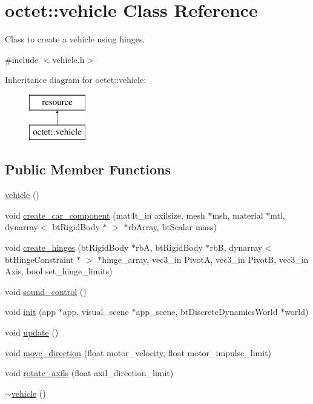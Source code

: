 \hypertarget{classoctet_1_1vehicle}{\section{octet\+:\+:vehicle Class Reference}
\label{classoctet_1_1vehicle}
}


Class to create a vehicle using hinges.  




{\ttfamily \#include $<$vehicle.\+h$>$}

Inheritance diagram for octet\+:\+:vehicle\+:\begin{figure}[H]
\begin{center}
\leavevmode
\includegraphics[height=2.000000cm]{classoctet_1_1vehicle}
\end{center}
\end{figure}
\subsection*{Public Member Functions}
\begin{DoxyCompactItemize}
\item 
\hyperlink{classoctet_1_1vehicle_a22017fec042aa7732f1699b535390787}{vehicle} ()
\item 
void \hyperlink{classoctet_1_1vehicle_aa0d5baefeba0587e62f9c62dc87506fb}{create\+\_\+car\+\_\+component} (mat4t\+\_\+in axilsize, mesh $\ast$msh, material $\ast$mtl, dynarray$<$ bt\+Rigid\+Body $\ast$ $>$ $\ast$rb\+Array, bt\+Scalar mass)
\item 
void \hyperlink{classoctet_1_1vehicle_a36bcb4433889025632bfec79f681a877}{create\+\_\+hinges} (bt\+Rigid\+Body $\ast$rb\+A, bt\+Rigid\+Body $\ast$rb\+B, dynarray$<$ bt\+Hinge\+Constraint $\ast$ $>$ $\ast$hinge\+\_\+array, vec3\+\_\+in Pivot\+A, vec3\+\_\+in Pivot\+B, vec3\+\_\+in Axis, bool set\+\_\+hinge\+\_\+limits)
\item 
void \hyperlink{classoctet_1_1vehicle_a45b69ee9ab03cf7b1c05dfdb88eb783c}{sound\+\_\+control} ()
\item 
void \hyperlink{classoctet_1_1vehicle_af1ecc8cb043d912123287e085dd3417d}{init} (app $\ast$app, visual\+\_\+scene $\ast$app\+\_\+scene, bt\+Discrete\+Dynamics\+World $\ast$world)
\item 
void \hyperlink{classoctet_1_1vehicle_a8c833c3ae603e9ae1355a60fb10a43de}{update} ()
\item 
void \hyperlink{classoctet_1_1vehicle_a21db8dc5ab149c9bd9b4243a8c7db083}{move\+\_\+direction} (float motor\+\_\+velocity, float motor\+\_\+impulse\+\_\+limit)
\item 
void \hyperlink{classoctet_1_1vehicle_a65369849e223781de684f4466074b739}{rotate\+\_\+axils} (float axil\+\_\+direction\+\_\+limit)
\item 
\hyperlink{classoctet_1_1vehicle_a8722711090082884b7f4acc4b3c2d6fe}{$\sim$vehicle} ()
\end{DoxyCompactItemize}
